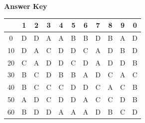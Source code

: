 \documentclass[11pt,a4paper]{article}
\begin{document}
\textbf{Answer Key}
\begin{tabular}{ | c | c c c c c c c c c c | }
\hline
 & 1 & 2 & 3 & 4 & 5 & 6 & 7 & 8 & 9 & 0 \\
\hline
0 & D & D & A & A & B & B & D & B & A & D \\
10 & D & A & C & D & D & C & A & D & B & D \\
20 & C & A & D & D & C & D & A & D & D & B \\
30 & B & C & D & B & B & A & D & C & A & C \\
40 & B & C & C & C & D & D & C & A & C & B \\
50 & A & D & C & D & D & A & C & C & D & B \\
60 & B & D & D & A & A & A & D & B & C & D \\
\hline
\end{tabular}
\clearpage
\end{document}
